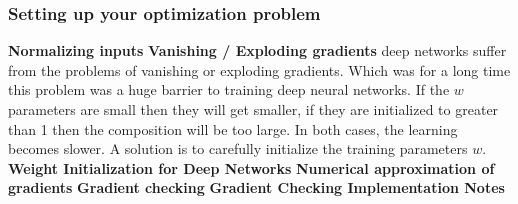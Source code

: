 \subsubsection*{Setting up your optimization problem}
\textbf{Normalizing inputs}
\newline
\textbf{Vanishing / Exploding gradients} deep networks suffer from the problems of vanishing or exploding gradients. Which was for a long time this problem was a huge barrier to training deep neural networks. If the $w$ parameters are small then they will get smaller, if they are initialized to greater than 1 then the composition will be too large. In both cases, the learning becomes slower.
A solution is to carefully initialize the training parameters $w$.
\newline
\textbf{Weight Initialization for Deep Networks}
\newline
\textbf{Numerical approximation of gradients}
\newline
\textbf{Gradient checking}
\newline
\textbf{Gradient Checking Implementation Notes}

